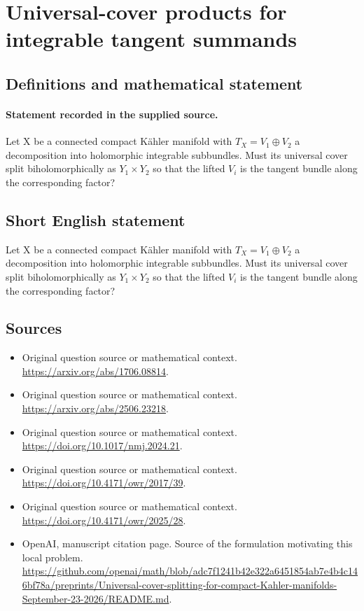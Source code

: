 \documentclass[11pt]{article}
\begin{document}
\section*{Universal-cover products for integrable tangent summands}\label{30007068}
\subsection{Definitions and mathematical statement}
\paragraph{Statement recorded in the supplied source.}
Let X be a connected compact Kähler manifold with $T_X=V_{1}\oplus V_{2}$ a decomposition into holomorphic integrable subbundles. Must its universal cover split biholomorphically as $Y_{1}×Y_{2}$ so that the lifted $V_i$ is the tangent bundle along the corresponding factor?
\subsection{Short English statement}
Let X be a connected compact Kähler manifold with $T_X=V_{1}\oplus V_{2}$ a decomposition into holomorphic integrable subbundles. Must its universal cover split biholomorphically as $Y_{1}×Y_{2}$ so that the lifted $V_i$ is the tangent bundle along the corresponding factor?
\subsection{Sources}
\begin{itemize}
\item[S1] Original question source or mathematical context.
\url{https://arxiv.org/abs/1706.08814}.
\item[S2] Original question source or mathematical context.
\url{https://arxiv.org/abs/2506.23218}.
\item[S3] Original question source or mathematical context.
\url{https://doi.org/10.1017/nmj.2024.21}.
\item[S4] Original question source or mathematical context.
\url{https://doi.org/10.4171/owr/2017/39}.
\item[S5] Original question source or mathematical context.
\url{https://doi.org/10.4171/owr/2025/28}.
\item[S6] OpenAI, manuscript citation page. Source of the formulation motivating this local problem.
\url{https://github.com/openai/math/blob/adc7f1241b42e322a6451854ab7e4b4c146bf78a/preprints/Universal-cover-splitting-for-compact-Kahler-manifolds-September-23-2026/README.md}.
\end{itemize}
\end{document}
